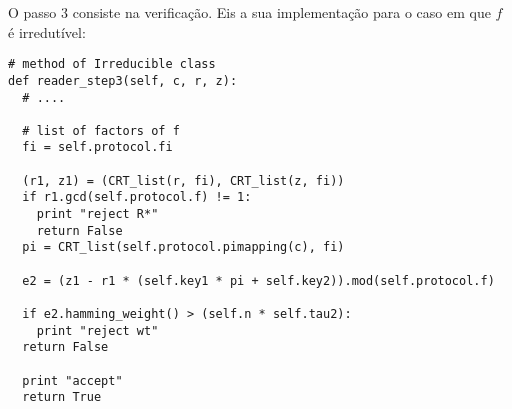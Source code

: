 O passo 3 consiste na verificação. Eis a sua implementação para o caso em que $f$ é irredutível:
\begin{lstlisting}[style=sage]
# method of Irreducible class
def reader_step3(self, c, r, z):
  # ....
  
  # list of factors of f
  fi = self.protocol.fi

  (r1, z1) = (CRT_list(r, fi), CRT_list(z, fi))
  if r1.gcd(self.protocol.f) != 1:
    print "reject R*"
    return False
  pi = CRT_list(self.protocol.pimapping(c), fi)

  e2 = (z1 - r1 * (self.key1 * pi + self.key2)).mod(self.protocol.f)

  if e2.hamming_weight() > (self.n * self.tau2):
    print "reject wt"
  return False

  print "accept"
  return True
\end{lstlisting}